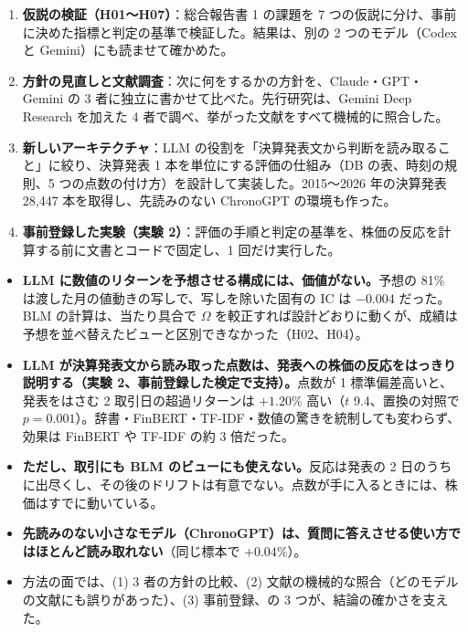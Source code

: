 \documentclass[xelatex,ja=standard,jafont=haranoaji,a4paper,10pt]{bxjsreport}
\begin{document}
\begin{enumerate}
\item \textbf{仮説の検証（H01〜H07）}：総合報告書 1 の課題を 7 つの仮説に分け、事前に決めた指標と判定の基準で検証した。結果は、別の 2 つのモデル（Codex と Gemini）にも読ませて確かめた。
\item \textbf{方針の見直しと文献調査}：次に何をするかの方針を、Claude・GPT・Gemini の 3 者に独立に書かせて比べた。先行研究は、Gemini Deep Research を加えた 4 者で調べ、挙がった文献をすべて機械的に照合した。
\item \textbf{新しいアーキテクチャ}：LLM の役割を「決算発表文から判断を読み取ること」に絞り、決算発表 1 本を単位にする評価の仕組み（DB の表、時刻の規則、5 つの点数の付け方）を設計して実装した。2015〜2026 年の決算発表 28,447 本を取得し、先読みのない ChronoGPT の環境も作った。
\item \textbf{事前登録した実験（実験 2）}：評価の手順と判定の基準を、株価の反応を計算する前に文書とコードで固定し、1 回だけ実行した。
\end{enumerate}

\begin{keybox}[本書の主な結論]
\begin{itemize}
\item \textbf{LLM に数値のリターンを予想させる構成には、価値がない。}予想の 81\% は渡した月の値動きの写しで、写しを除いた固有の IC は $-0.004$ だった。BLM の計算は、当たり具合で $\Omega$ を較正すれば設計どおりに動くが、成績は予想を並べ替えたビューと区別できなかった（H02、H04）。
\item \textbf{LLM が決算発表文から読み取った点数は、発表への株価の反応をはっきり説明する（実験 2、事前登録した検定で支持）。}点数が 1 標準偏差高いと、発表をはさむ 2 取引日の超過リターンは $+1.20\%$ 高い（$t$ 9.4、置換の対照で $p=0.001$）。辞書・FinBERT・TF-IDF・数値の驚きを統制しても変わらず、効果は FinBERT や TF-IDF の約 3 倍だった。
\item \textbf{ただし、取引にも BLM のビューにも使えない。}反応は発表の 2 日のうちに出尽くし、その後のドリフトは有意でない。点数が手に入るときには、株価はすでに動いている。
\item \textbf{先読みのない小さなモデル（ChronoGPT）は、質問に答えさせる使い方ではほとんど読み取れない}（同じ標本で $+0.04\%$）。
\item 方法の面では、(1) 3 者の方針の比較、(2) 文献の機械的な照合（どのモデルの文献にも誤りがあった）、(3) 事前登録、の 3 つが、結論の確かさを支えた。
\end{itemize}
\end{keybox}
\end{document}
